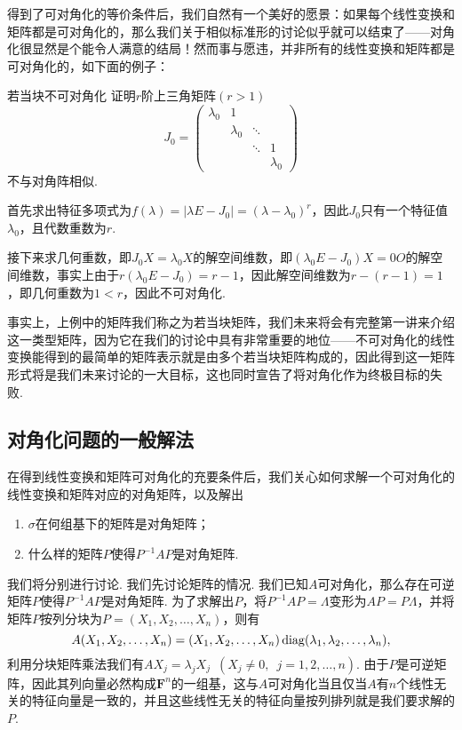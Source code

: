 得到了可对角化的等价条件后，我们自然有一个美好的愿景：如果每个线性变换和矩阵都是可对角化的，那么我们关于相似标准形的讨论似乎就可以结束了——对角化很显然是个能令人满意的结局！然而事与愿违，并非所有的线性变换和矩阵都是可对角化的，如下面的例子：
\begin{example}{}{若当块不可对角化}
    证明$r$阶上三角矩阵$(r>1)$
    \[J_0=\begin{pmatrix}
            \lambda_0 & 1         &        &           \\
                      & \lambda_0 & \ddots &           \\
                      &           & \ddots & 1         \\
                      &           &        & \lambda_0
        \end{pmatrix}\]
    不与对角阵相似.
\end{example}

\begin{solution}
    首先求出特征多项式为$f(\lambda)=|\lambda E-J_0|=(\lambda-\lambda_0)^r$，因此$J_0$只有一个特征值$\lambda_0$，且代数重数为$r$.

    接下来求几何重数，即$J_0X=\lambda_0X$的解空间维数，即$(\lambda_0 E-J_0)X=0O$的解空间维数，事实上由于$r(\lambda_0 E-J_0)=r-1$，因此解空间维数为$r-(r-1)=1$，即几何重数为$1<r$，因此不可对角化.
\end{solution}

事实上，上例中的矩阵我们称之为若当块矩阵，我们未来将会有完整第一讲来介绍这一类型矩阵，因为它在我们的讨论中具有非常重要的地位——不可对角化的线性变换能得到的最简单的矩阵表示就是由多个若当块矩阵构成的，因此得到这一矩阵形式将是我们未来讨论的一大目标，这也同时宣告了将对角化作为终极目标的失败.

\subsection{对角化问题的一般解法}

在得到线性变换和矩阵可对角化的充要条件后，我们关心如何求解一个可对角化的线性变换和矩阵对应的对角矩阵，以及解出
\begin{enumerate}
    \item $\sigma$在何组基下的矩阵是对角矩阵；

    \item 什么样的矩阵$P$使得$P^{-1}AP$是对角矩阵.
\end{enumerate}

我们将分别进行讨论. 我们先讨论矩阵的情况. 我们已知$A$可对角化，那么存在可逆矩阵$P$使得$P^{-1}AP$是对角矩阵. 为了求解出$P$，将$P^{-1}AP=\varLambda$变形为$AP=P\varLambda$，并将矩阵$P$按列分块为$P=(X_1,X_2,\ldots,X_n)$，则有
\[A(X_1,X_2,\ldots,X_n)=(X_1,X_2,\ldots,X_n)\operatorname{diag}(\lambda_1,\lambda_2,\ldots,\lambda_n),\]
利用分块矩阵乘法我们有$AX_j=\lambda_jX_j\enspace(X_j\neq 0,\enspace j=1,2,\ldots,n)$. 由于$P$是可逆矩阵，因此其列向量必然构成$\mathbf{F}^n$的一组基，这与$A$可对角化当且仅当$A$有$n$个线性无关的特征向量是一致的，并且这些线性无关的特征向量按列排列就是我们要求解的$P$.

